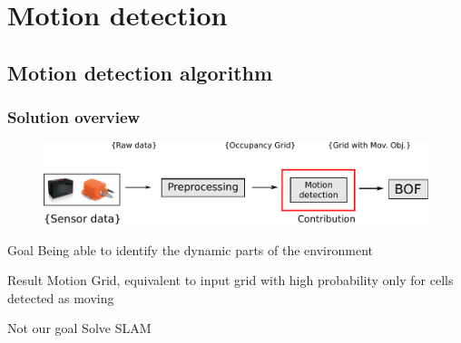 \documentclass{beamer}
\begin{document}

\section{Motion detection}

\subsection*{Motion detection algorithm}

	\begin{frame}
		\frametitle{Solution overview}
		\begin{figure}[h]
			\center
			\includegraphics[scale=0.6]{img/fig:motion:overview:01}
		 \end{figure}
		\begin{block}{Goal}
			 Being able to identify the dynamic parts of the environment
		\end{block}
		 
		\begin{block}{Result}
			Motion Grid, equivalent to input grid with high probability only for cells detected as moving
		\end{block}				 

		\begin{alertblock}{Not our goal}
			Solve SLAM
		\end{alertblock}
	\end{frame}
\end{document}
